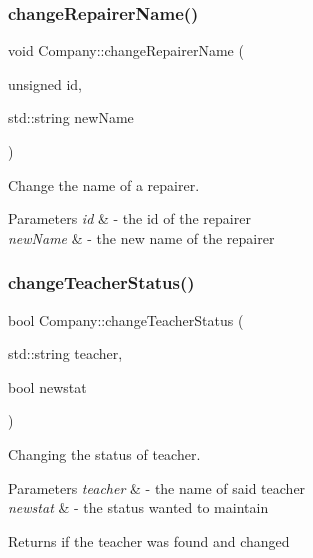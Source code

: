 \subsubsection{\texorpdfstring{change\+Repairer\+Name()}{changeRepairerName()}}
{\footnotesize\ttfamily void Company\+::change\+Repairer\+Name (\begin{DoxyParamCaption}\item[{unsigned}]{id,  }\item[{std\+::string}]{new\+Name }\end{DoxyParamCaption})}



Change the name of a repairer. 


\begin{DoxyParams}{Parameters}
{\em id} & -\/ the id of the repairer \\
\hline
{\em new\+Name} & -\/ the new name of the repairer \\
\hline
\end{DoxyParams}
\mbox{\label{class_company_a6ab661c94b41a0b6ef74fec280bf849e}} 
\subsubsection{\texorpdfstring{change\+Teacher\+Status()}{changeTeacherStatus()}}
{\footnotesize\ttfamily bool Company\+::change\+Teacher\+Status (\begin{DoxyParamCaption}\item[{std\+::string}]{teacher,  }\item[{bool}]{newstat }\end{DoxyParamCaption})}



Changing the status of teacher. 


\begin{DoxyParams}{Parameters}
{\em teacher} & -\/ the name of said teacher \\
\hline
{\em newstat} & -\/ the status wanted to maintain \\
\hline
\end{DoxyParams}
\begin{DoxyReturn}{Returns}
if the teacher was found and changed 
\end{DoxyReturn}
\mbox{\label{class_company_a53a891acc19de4d24a82fd9f108cfe68}} 
